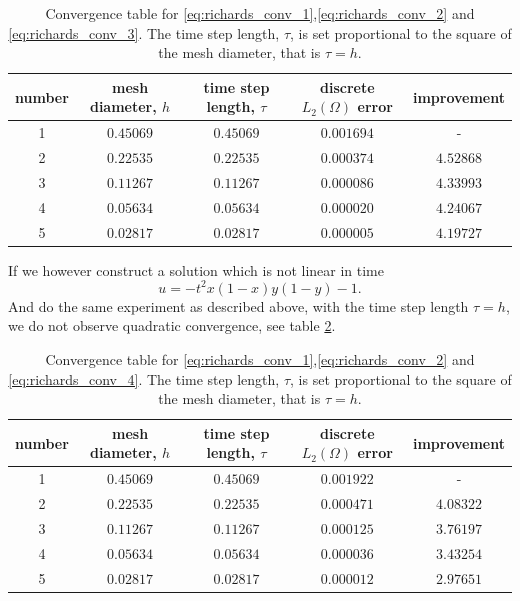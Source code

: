 \documentclass[../Main/main.tex]{subfiles}
\begin{document}
	\begin{table}[H]
	\centering
		\begin{tabular}{|c c c c c|}
			\hline
			number & mesh diameter, $h$ & time step length, $\tau$ & discrete $L_2(\Omega)$ error & improvement \\
			\hline
				1&$0.45069$&$0.45069$&$0.001694$&-\\ 
				2&$0.22535$&$0.22535$&$0.000374$&$4.52868$\\
				3&$0.11267$&$0.11267$&$0.000086$&$4.33993$\\
				4&$0.05634$&$0.05634$&$0.000020$&$4.24067$\\
				5&$0.02817$&$0.02817$&$0.000005$&$4.19727$\\
			\hline
		\end{tabular}
		\caption{Convergence table for \eqref{eq:richards_conv_1},\eqref{eq:richards_conv_2} and \eqref{eq:richards_conv_3}. The time step length, $\tau$, is set proportional to the square of the mesh diameter, that is $\tau=h$.}
		\label{tab:rihcards2}
	\end{table}
	If we however construct a solution which is not linear in time
	\begin{equation}\label{eq:richards_conv_4}
		u = -t^2x(1-x)y(1-y)-1.
	\end{equation}
	And do the same experiment as described above, with the time step length $\tau=h$, we do not observe quadratic convergence, see table \ref{tab:rihcards3}.
	\begin{table}[H]
	\centering
	\begin{tabular}{|c c c c c|}
		\hline
		number & mesh diameter, $h$ & time step length, $\tau$ & discrete $L_2(\Omega)$ error & improvement \\
		\hline
			1&$0.45069$&$0.45069$&$0.001922$&-\\ 
			2&$0.22535$&$0.22535$&$0.000471$&$4.08322$\\
			3&$0.11267$&$0.11267$&$0.000125$&$3.76197$\\
			4&$0.05634$&$0.05634$&$0.000036$&$3.43254$\\
			5&$0.02817$&$0.02817$&$0.000012$&$2.97651$\\
		\hline
	\end{tabular}
	\caption{Convergence table for \eqref{eq:richards_conv_1},\eqref{eq:richards_conv_2} and \eqref{eq:richards_conv_4}. The time step length, $\tau$, is set proportional to the square of the mesh diameter, that is $\tau=h$.}
	\label{tab:rihcards3}
\end{table}
\end{document}
